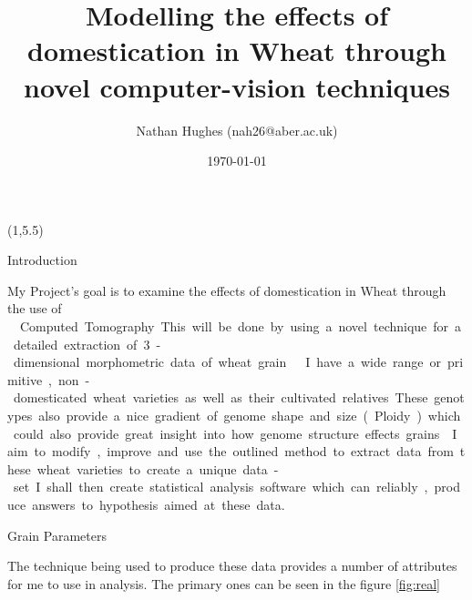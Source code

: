 \documentclass[final]{beamer}
\title{Modelling the effects of domestication in Wheat through novel computer-vision techniques}
\author{Nathan Hughes (nah26@aber.ac.uk)}
\date{\today}
\begin{document}
\begin{frame}{} 

  \begin{textblock}{28}(1,5.5)

    \begin{block}{Introduction}


      My Project's goal is to examine the effects of domestication in Wheat through the use of \si\micro\-Computed Tomography.
      This will be done by using a novel technique for a detailed extraction of 3-dimensional morphometric data of wheat grain \cite{Hughes2017}.

      \vspace{0.5cm}
      
      I have a wide range or primitive, non-domesticated wheat varieties
      as well as their cultivated relatives. These genotypes also provide a nice gradient of genome shape and size (Ploidy)
      which could also provide great insight into how genome structure effects grains.

      \vspace{0.5cm}
      
      I aim to modify, improve and use the outlined method to extract data from these wheat varieties to create a unique data-set.
      I shall then create statistical analysis software which can reliably, produce answers to hypothesis aimed at these data.
      
    \end{block}


    \begin{block}{Grain Parameters}

      The technique being used to produce these data provides a number of attributes for me to use in
      analysis. The primary ones can be seen in the figure \ref{fig:real}


\end{block}
\end{textblock}
\end{frame}
\end{document}
